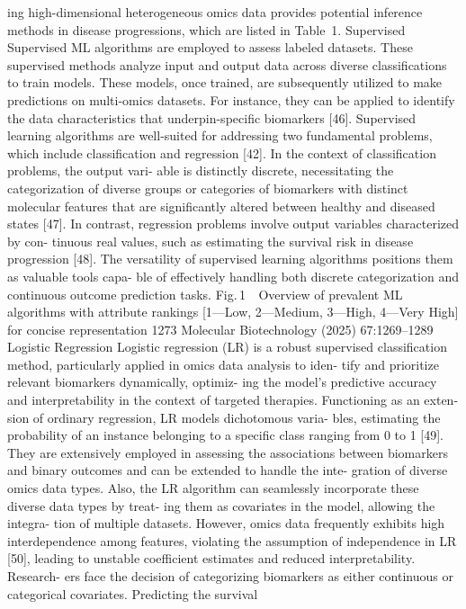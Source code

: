 ing high-dimensional heterogeneous omics data provides
potential inference methods in disease progressions, which
are listed in Table 1.
Supervised
Supervised ML algorithms are employed to assess labeled
datasets. These supervised methods analyze input and
output data across diverse classifications to train models.
These models, once trained, are subsequently utilized to
make predictions on multi-omics datasets. For instance,
they can be applied to identify the data characteristics that
underpin-specific biomarkers [46]. Supervised learning
algorithms are well-suited for addressing two fundamental
problems, which include classification and regression [42].
In the context of classification problems, the output vari-
able is distinctly discrete, necessitating the categorization
of diverse groups or categories of biomarkers with distinct
molecular features that are significantly altered between
healthy and diseased states [47]. In contrast, regression
problems involve output variables characterized by con-
tinuous real values, such as estimating the survival risk
in disease progression [48]. The versatility of supervised
learning algorithms positions them as valuable tools capa-
ble of effectively handling both discrete categorization and
continuous outcome prediction tasks.
Fig. 1   Overview of prevalent ML algorithms with attribute rankings [1—Low, 2—Medium, 3—High, 4—Very High] for concise representation
1273
Molecular Biotechnology (2025) 67:1269–1289
Logistic Regression
Logistic regression (LR) is a robust supervised classification
method, particularly applied in omics data analysis to iden-
tify and prioritize relevant biomarkers dynamically, optimiz-
ing the model’s predictive accuracy and interpretability in
the context of targeted therapies. Functioning as an exten-
sion of ordinary regression, LR models dichotomous varia-
bles, estimating the probability of an instance belonging to a
specific class ranging from 0 to 1 [49]. They are extensively
employed in assessing the associations between biomarkers
and binary outcomes and can be extended to handle the inte-
gration of diverse omics data types. Also, the LR algorithm
can seamlessly incorporate these diverse data types by treat-
ing them as covariates in the model, allowing the integra-
tion of multiple datasets. However, omics data frequently
exhibits high interdependence among features, violating the
assumption of independence in LR [50], leading to unstable
coefficient estimates and reduced interpretability. Research-
ers face the decision of categorizing biomarkers as either
continuous or categorical covariates. Predicting the survival
